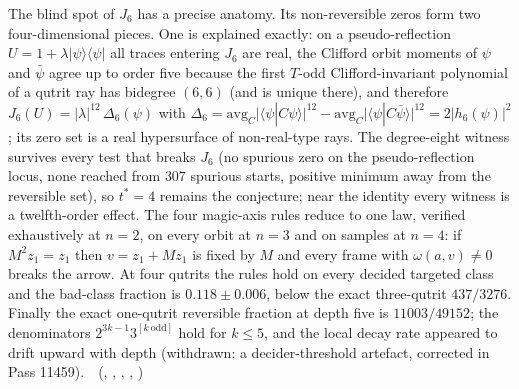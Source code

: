 The blind spot of $J_6$ has a precise anatomy. Its non-reversible zeros form two four-dimensional pieces. One is explained
exactly: on a pseudo-reflection $U=1+\lambda\lvert\psi\rangle\langle\psi\rvert$ all traces entering $J_6$ are real, the Clifford orbit
moments of $\psi$ and $\bar\psi$ agree up to order five because the first $T$-odd Clifford-invariant polynomial of a qutrit ray has
bidegree $(6,6)$ (and is unique there), and therefore $J_6(U)=\lvert\lambda\rvert^{12}\,\Delta_6(\psi)$ with
$\Delta_6=\mathrm{avg}_C\lvert\langle\psi|C\psi\rangle\rvert^{12}-\mathrm{avg}_C\lvert\langle\psi|C\bar\psi\rangle\rvert^{12}=2\lvert h_6(\psi)\rvert^2$; its zero set is a
real hypersurface of non-real-type rays. The degree-eight witness survives every test that breaks $J_6$ (no spurious zero on the
pseudo-reflection locus, none reached from $307$ spurious starts, positive minimum away from the reversible set), so $t^\ast=4$
remains the conjecture; near the identity every witness is a twelfth-order effect. The four magic-axis rules reduce to one
law, verified exhaustively at $n=2$, on every orbit at $n=3$ and on samples at $n=4$: if $M^2z_1=z_1$ then $v=z_1+Mz_1$ is fixed
by $M$ and every frame with $\omega(a,v)\neq0$ breaks the arrow. At four qutrits the rules hold on every decided targeted class
and the bad-class fraction is $0.118\pm0.006$, below the exact three-qutrit $437/3276$. Finally the exact one-qutrit reversible
fraction at depth five is $11003/49152$; the denominators $2^{3k-1}3^{[k\ \mathrm{odd}]}$ hold for $k\le5$, and the local decay rate
appeared to drift upward with depth (withdrawn: a decider-threshold artefact, corrected in Pass 11459). \tierT\,\tierC\ (,
, ,
, )

